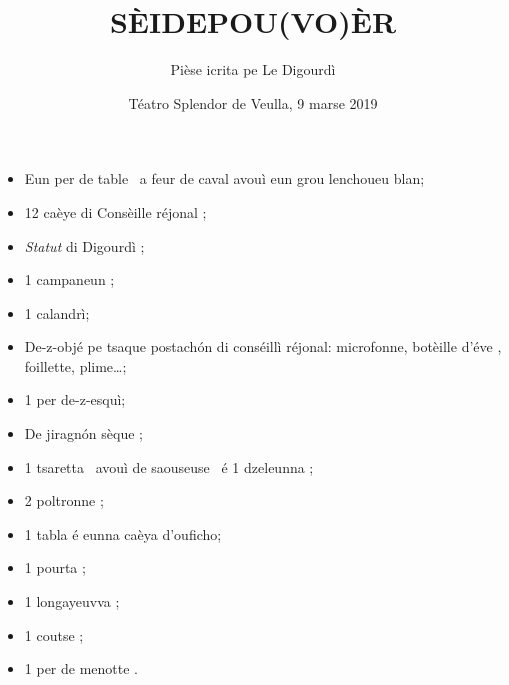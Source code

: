 \title{SÈIDEPOU(VO)ÈR}
\author{Pièse icrita pe Le Digourdì}
\date{Téatro Splendor de Veulla, 9 marse 2019}

\maketitle






\Scenographie
\begin{itemize}
\item[$\bullet$] Eun per de table \tabla\ a feur de caval avouì eun grou lenchoueu blan;
\item[$\bullet$] 12 caèye di Consèille réjonal \sedia ;
\item[$\bullet$] \textit{Statut} di Digourdì \livro ;
\item[$\bullet$] 1 campaneun \campanel ;
\item[$\bullet$]1 calandrì;
\item[$\bullet$] De-z-objé pe tsaque postach\'on di conséillì réjonal: microfonne, botèille d'éve \boteilledeve , foillette, plime\ldots ;
\item[$\bullet$] 1 per de-z-esquì\eski ;
\item[$\bullet$] De jiragn\'on sèque \frappe;
\item[$\bullet$] 1 tsaretta \tsaretta\ avouì de saouseuse \salan\ é 1 dzeleunna \gallina ;
\item[$\bullet$] 2 poltronne \poltrona ;
\item[$\bullet$] 1 tabla é eunna caèya d'ouficho;
\item [$\bullet$] 1 pourta \porta ;
\item [$\bullet$] 1 longayeuvva \binocolo ;
\item [$\bullet$] 1 coutse  ;
\item [$\bullet$] 1 per de menotte \manette .
\end{itemize}


